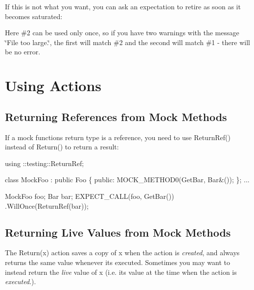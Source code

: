 If this is not what you want, you can ask an expectation to retire as soon as it becomes saturated\+:




Here \#2 can be used only once, so if you have two warnings with the message {\ttfamily \char`\"{}\+File too large.\char`\"{}}, the first will match \#2 and the second will match \#1 -\/ there will be no error.

\section*{Using Actions}

\subsection*{Returning References from Mock Methods}

If a mock function\textquotesingle{}s return type is a reference, you need to use {\ttfamily Return\+Ref()} instead of {\ttfamily Return()} to return a result\+:


\begin{DoxyCode}
using ::testing::ReturnRef;

\textcolor{keyword}{class }MockFoo : \textcolor{keyword}{public} Foo \{
 \textcolor{keyword}{public}:
  MOCK\_METHOD0(GetBar, Bar&());
\};
...

  MockFoo foo;
  Bar bar;
  EXPECT\_CALL(foo, GetBar())
      .WillOnce(ReturnRef(bar));
\end{DoxyCode}


\subsection*{Returning Live Values from Mock Methods}

The {\ttfamily Return(x)} action saves a copy of {\ttfamily x} when the action is {\itshape created}, and always returns the same value whenever it\textquotesingle{}s executed. Sometimes you may want to instead return the {\itshape live} value of {\ttfamily x} (i.\+e. its value at the time when the action is {\itshape executed}.).

